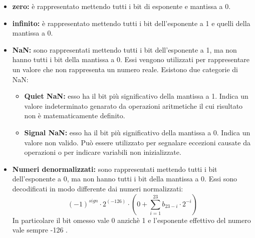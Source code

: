 \documentclass[]{IEEEtran}
\begin{document}
\begin{itemize}
    \item \textbf{zero:} è rappresentato mettendo tutti i bit di esponente e mantissa a 0.
    \item \textbf{infinito:} è rappresentato mettendo tutti i bit dell'esponente a 1 e quelli della mantissa a 0.
    \item \textbf{NaN:} sono rappresentati mettendo tutti i bit dell'esponente a 1, ma non hanno tutti i bit della mantissa a 0. Essi vengono utilizzati per rappresentare un valore che non rappresenta un numero reale. Esistono due categorie di NaN:
          \begin{itemize}
              \item \textbf{Quiet NaN:} esso ha il bit più significativo della mantissa a 1. Indica un valore indeterminato genarato da operazioni aritmetiche il cui risultato non è matematicamente definito.
              \item \textbf{Signal NaN:} esso ha il bit più significativo della mantissa a 0. Indica un valore non valido. Può essere utilizzato per segnalare eccezioni causate da operazioni o per indicare variabili non inizializzate.
          \end{itemize}
    \item \textbf{Numeri denormalizzati:} sono rappresentati mettendo tutti i bit dell'esponente a 0, ma non hanno tutti i bit della mantissa a 0. Essi sono decodificati in modo differente dai numeri normalizzati: $$(-1)^{sign}\cdot 2^{(-126)} \cdot (0 + \sum_{i=1}^{23}b_{23-i}\cdot 2^{-i})$$ In particolare il bit omesso vale 0 anzichè 1 e l'esponente effettivo del numero vale sempre -126  \cite{IEEE754Online}.
\end{itemize}
\end{document}
